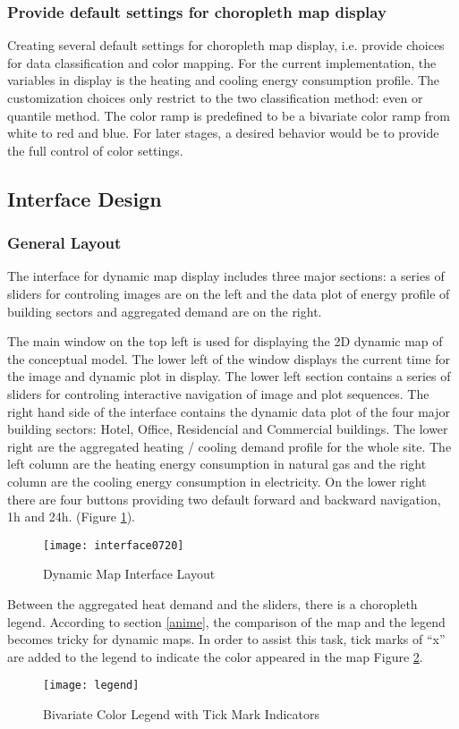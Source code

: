 \documentclass[hidelinks,12pt]{article}
\newcommand{\fref}[1]{Figure \ref{#1}}
\begin{document}
\subsubsection{Provide default settings for choropleth map display}
Creating several default settings for choropleth map display,
i.e. provide choices for data classification and color mapping. For
the current implementation, the variables in display is the heating
and cooling energy consumption profile. The customization choices only
restrict to the two classification method: even or quantile
method. The color ramp is predefined to be a bivariate color ramp from
white to red and blue. For later stages, a desired behavior would be
to provide the full control of color settings.

\subsection{Interface Design}\label{interfaceDesign}
\subsubsection {General Layout}
The interface for dynamic map display includes three major sections: a
series of sliders for controling images are on the left and the data
plot of energy profile of building sectors and aggregated demand are
on the right.

The main window on the top left is used for displaying the 2D dynamic
map of the conceptual model. The lower left of the window displays the
current time for the image and dynamic plot in display. The lower left
section contains a series of sliders for controling interactive
navigation of image and plot sequences. The right hand side of the
interface contains the dynamic data plot of the four major building
sectors: Hotel, Office, Residencial and Commercial buildings. The
lower right are the aggregated heating / cooling demand profile for
the whole site. The left column are the heating energy consumption in
natural gas and the right column are the cooling energy consumption in
electricity. On the lower right there are four buttons providing two
default forward and backward navigation, 1h and
24h. (\fref{fig:interface0720}).
\begin{figure}[h!]
  \centering
  \texttt{[image: interface0720]}
  \caption{Dynamic Map Interface Layout}
  \label{fig:interface0720}
\end{figure}

Between the aggregated heat demand and the sliders, there is a
choropleth legend. According to section \ref{anime}, the comparison of
the map and the legend becomes tricky for dynamic maps. In order to
assist this task, tick marks of ``x'' are added to the legend to
indicate the color appeared in the map \fref{fig:legend}.
\begin{figure}[h!]
  \centering
  \texttt{[image: legend]}
  \caption{Bivariate Color Legend with Tick Mark Indicators}
  \label{fig:legend}
\end{figure}
\end{document}
